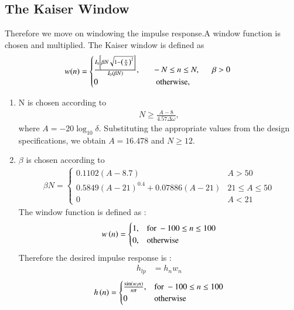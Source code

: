 \documentclass{article}
\begin{document}
\subsection{The Kaiser Window}
Therefore we move on windowing the impulse response.A window function is chosen and multiplied. The Kaiser window is defined as
\begin{align}
    w(n) =
\begin{cases}
\frac{I_0\left[ \beta N \sqrt{1 - \left(\frac{n}{N}\right)^2} \right]}{I_0(\beta N)},
 \indent -N \leq n \leq N, \indent \beta > 0 \nonumber \\
 0 \hspace{2.5 cm} \mbox{otherwise,}
\end{cases}
\end{align}
\begin{enumerate}
    \item  N is chosen according to
  \begin{align}
     N \geq \frac{A-8}{4.57\Delta \omega},
 \end{align}
  where $A = -20\log_{10}\delta$.  Substituting the appropriate values from the design specifications, we obtain
      $A = 16.478$ and $N \geq 12$.
                  
    \item  $\beta$ is chosen according to
 \begin{align}
  \beta N = \left\{ \begin{array}{ll} 0.1102(A-8.7)            & A > 50            \\
 0.5849(A-21)^{0.4}+ 0.07886(A-21) & 21 \leq A \leq 50 \\ 
 0  & A < 21\end{array} \right.
  \end{align}
  The window function is defined as :
\begin{align}
  w\left(n\right) = 
  \begin{cases} 
   1, & \text{for } -100\leq n \leq 100 \\
  0, & \text{otherwise }
  \end{cases} \label{eq:w(n)_for_Kaiser}
  \end{align}
Therefore the desired impulse response is :
\begin{align}
  h_{lp} & = h_{n}w_{n}
 \end{align}
\begin{align}
  h\left(n\right) = 
  \begin{cases} 
   \frac{\sin(w_l n)}{n\pi}, & \text{for } -100\leq n \leq 100 \\
   0  & \text{otherwise}
\end{cases} \label{eq:h(n)desired_for_LPF}
 \end{align}
\end{enumerate}
\end{document}
